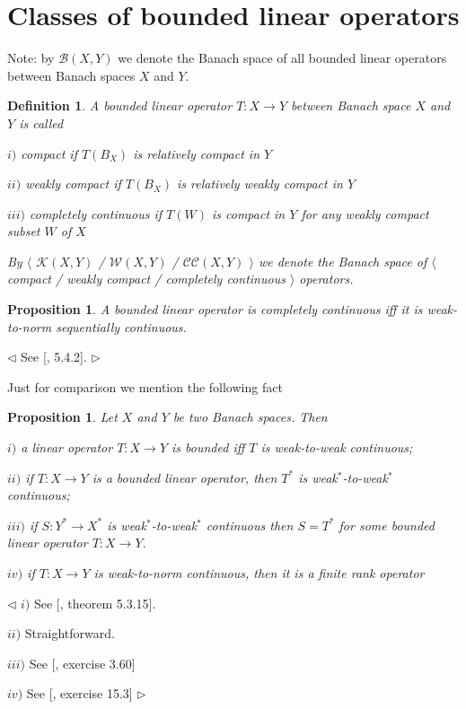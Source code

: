 \documentclass[12pt]{article}
\newtheorem{proposition}[theorem]{Proposition}
\newtheorem{definition}[theorem]{Definition}
\newenvironment{proof}{\par $\triangleleft$}{$\triangleright$}
\begin{document}
\section{Classes of bounded linear operators}

Note: by $\mathcal{B}(X,Y)$ we denote the Banach space of all bounded linear operators between Banach spaces $X$ and $Y$.

\begin{definition} A bounded linear operator $T:X\to Y$ between Banach space $X$ and $Y$ is called

$i)$ compact if $T(B_X)$ is relatively compact in $Y$

$ii)$ weakly compact if $T(B_X)$ is relatively weakly compact in $Y$

$iii)$ completely continuous if $T(W)$ is compact in $Y$ for any weakly compact subset $W$ of $X$

By $\langle$ $\mathcal{K}(X,Y)$ / $\mathcal{W}(X,Y)$ / $\mathcal{CC}(X,Y)$ $\rangle$ we denote the Banach space of $\langle$ compact / weakly compact / completely continuous $\rangle$ operators.
\end{definition}

\begin{proposition} A bounded linear operator is completely continuous iff it is weak-to-norm sequentially  continuous.
\end{proposition}
\begin{proof} See [\cite{KalAlbTopicsBanSpTh}, 5.4.2].
\end{proof}

Just for comparison we mention the following fact

\begin{proposition} Let $X$ and $Y$ be two Banach spaces. Then

$i)$ a linear operator $T:X\to Y$ is bounded iff $T$ is weak-to-weak continuous;

$ii)$ if $T:X\to Y$ is a bounded linear operator, then $T^*$ is weak${}^*$-to-weak${}^*$ continuous;

$iii)$ if $S:Y^*\to X^*$ is weak${}^*$-to-weak${}^*$ continuous then $S=T^*$ for some bounded linear operator $T:X\to Y$.

$iv)$ if $T:X\to Y$ is weak-to-norm continuous, then it is a finite rank operator
\end{proposition}
\begin{proof} $i)$ See [\cite{DunfSchwLinOpsVol1}, theorem 5.3.15].

$ii)$ Straightforward.

$iii)$ See [\cite{FabHabBanSpTh}, exercise 3.60]

$iv)$ See [\cite{FabHabBanSpTh}, exercise 15.3]
\end{proof}
\end{document}
